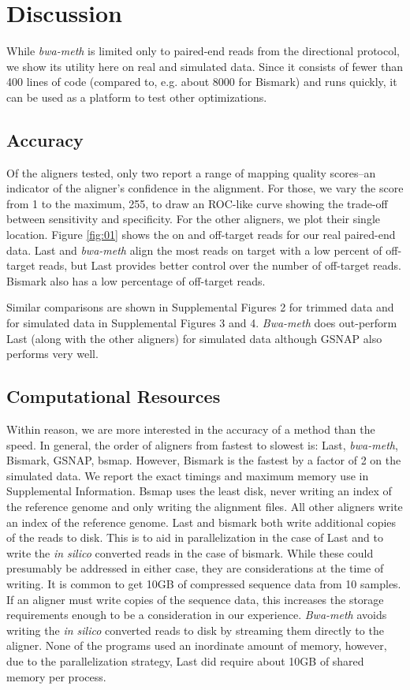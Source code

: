 \documentclass{bioinfo}
\begin{document}
\section{Discussion}

While \textit{bwa-meth} is limited only to paired-end reads from the directional
protocol, we show its utility here on real and simulated data. Since it consists
of fewer than 400 lines of code (compared to, e.g. about 8000 for Bismark) and runs
quickly, it can be used as a platform to test other optimizations.

\subsection{Accuracy}
Of the aligners tested, only two report a range of mapping quality
scores--an indicator of the aligner's confidence in the alignment. For
those, we vary the score from 1 to the maximum, 255, to draw an ROC-like
curve showing the trade-off between sensitivity and specificity. For the
other aligners, we plot their single location. Figure \ref{fig:01} shows
the on and off-target reads for our real paired-end data. Last and 
\textit{bwa-meth} align the most reads on target with a low percent
of off-target reads, but Last provides better control over the number
of off-target reads. Bismark also has a low percentage of off-target reads.

Similar comparisons are shown in  Supplemental Figures 2
for trimmed data and for simulated data in Supplemental Figures 3 and 4.
\textit{Bwa-meth} does out-perform Last (along with the other aligners)
for simulated data although GSNAP also performs very well.

\subsection{Computational Resources}
Within reason, we are more interested in the accuracy of a
method than the speed. In general, the order of aligners from fastest to
slowest is: Last, \textit{bwa-meth}, Bismark, GSNAP, bsmap. However, Bismark
is the fastest by a factor of 2 on the simulated data. We report the exact 
timings and maximum memory use in Supplemental Information.
Bsmap uses the least disk, never writing an index of the reference genome
and only writing the alignment files. All other aligners write an index of
the reference genome. Last and bismark both write additional copies of the
reads to disk. This is to aid in parallelization in the case of Last and to
write the \emph{in silico} converted reads in the case of bismark. While
these could presumably be addressed in either case, they are considerations
at the time of writing. It is common to get 10GB of compressed sequence data
from 10 samples. If an aligner must write copies of the
sequence data, this increases the storage requirements enough to be a
consideration in our experience. \textit{Bwa-meth} avoids writing the \emph{in silico}
converted reads to disk by streaming them directly to the aligner.
None of the programs used an inordinate amount of memory, however, due to
the parallelization strategy, Last did require about 10GB of shared memory
per process.
\end{document}
